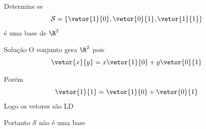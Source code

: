 \begin{question}
  Determine se
  \[
    \mathcal{S} =\left\{
      \vetor{1}{0},
      \vetor{0}{1},
      \vetor{1}{1}
    \right\}
  \]
  é uma base de $\R^{2}$
\end{question}

\begin{resolution}{Solução}
  O conjunto gera $\R^{2}$ pois
  \[
    \vetor{x}{y} = x\vetor{1}{0} + y\vetor{0}{1}
  \]

  \pause
  Porém
  \[
    \vetor{1}{1} = \vetor{1}{0} + \vetor{0}{1}
  \]
  \pause
  Logo os vetores são LD

  \pause
  Portanto $\mathcal{S}$ não é uma base
\end{resolution}

\endinput
